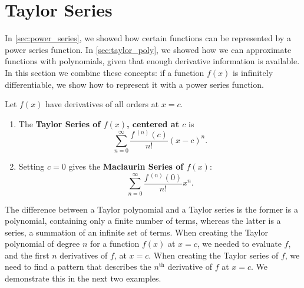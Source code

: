\section{Taylor Series}\label{sec:taylor_series}

In \autoref{sec:power_series}, we showed how certain functions can be represented by a power series function. In \autoref{sec:taylor_poly}, we showed how we can approximate functions with polynomials, given that enough derivative information is available. In this section we combine these concepts: if a function $f(x)$ is infinitely differentiable, we show how to represent it with a power series function.

\begin{definition}\label{def:taylor_series}%
Let $f(x)$ have derivatives of all orders at $x=c$.
\begin{enumerate}
	\item The \textbf{Taylor Series of $f(x)$, centered at $c$} is
	\[\sum_{n=0}^\infty \frac{f\,^{(n)}(c)}{n!}(x-c)^n.\]
	\item	Setting $c=0$ gives the \textbf{Maclaurin Series of $f(x)$}:
	\[\sum_{n=0}^\infty \frac{f\,^{(n)}(0)}{n!}x^n.\]
\end{enumerate}
\end{definition}


The difference between a Taylor polynomial and a Taylor series is the former is a polynomial, containing only a finite number of terms, whereas the latter is a series, a summation of an infinite set of terms. When creating the Taylor polynomial of degree $n$ for a function $f(x)$ at $x=c$, we needed to evaluate $f$, and the first $n$ derivatives of $f$, at $x=c$. When creating the Taylor series of $f$, we need to find a pattern that describes the $n^{\text{th}}$ derivative of $f$ at $x=c$. We demonstrate this in the next two examples.


